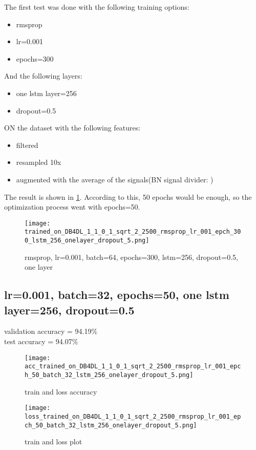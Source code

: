 \documentclass{article}
\begin{document}
The first test was done with the following training options:
\begin{itemize}
    \item rmsprop
    \item lr=0.001 
    \item epochs=300
\end{itemize}
And the following layers:
\begin{itemize}
    \item one lstm layer=256
    \item dropout=0.5
\end{itemize}
ON the dataset with the following features:
\begin{itemize}
    \item filtered
    \item resampled 10x
    \item augmented with the average of the signals(BN signal divider: )
\end{itemize}
\newpage
The result is shown in \figurename{\ref{trained_on_DB4DL_1_1_0_1_sqrt_2_2500_rmsprop_lr_001_epch_300_lstm_256_onelayer_dropout_5}}. According to this, 50 epochs would be enough, so the optimization process went with epochs=50. 

\begin{figure}[H]
\centering
\texttt{[image: trained\_on\_DB4DL\_1\_1\_0\_1\_sqrt\_2\_2500\_rmsprop\_lr\_001\_epch\_300\_lstm\_256\_onelayer\_dropout\_5.png]}
\caption{rmsprop, lr=0.001, batch=64, epochs=300, lstm=256, dropout=0.5, one layer}
\label{trained_on_DB4DL_1_1_0_1_sqrt_2_2500_rmsprop_lr_001_epch_300_lstm_256_onelayer_dropout_5}
\end{figure}

\bigskip
\subsection{lr=0.001, batch=32, epochs=50, one lstm layer=256, dropout=0.5}
validation accuracy = 94.19\%
\\
test accuracy = 94.07\%

\begin{figure}[H]
\centering
\texttt{[image: acc\_trained\_on\_DB4DL\_1\_1\_0\_1\_sqrt\_2\_2500\_rmsprop\_lr\_001\_epch\_50\_batch\_32\_lstm\_256\_onelayer\_dropout\_5.png]}
\caption{train and loss accuracy}
\end{figure}

\begin{figure}[H]
\centering
\texttt{[image: loss\_trained\_on\_DB4DL\_1\_1\_0\_1\_sqrt\_2\_2500\_rmsprop\_lr\_001\_epch\_50\_batch\_32\_lstm\_256\_onelayer\_dropout\_5.png]}
\caption{train and loss plot}
\end{figure}
\end{document}

